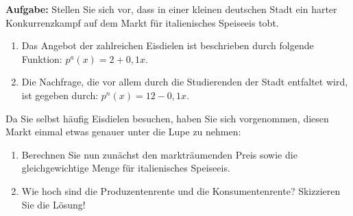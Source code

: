 
\textbf{Aufgabe:}  
Stellen Sie sich vor, dass in einer kleinen deutschen Stadt ein harter Konkurrenzkampf auf dem Markt für italienisches Speiseeis tobt.  

\begin{enumerate}[label=\alph*)]
    \item Das Angebot der zahlreichen Eisdielen ist beschrieben durch folgende Funktion: $p^a(x) = 2 + 0,1x$.
    \item Die Nachfrage, die vor allem durch die Studierenden der Stadt entfaltet wird, ist gegeben durch: $p^n(x) = 12 - 0,1x$.
\end{enumerate}

Da Sie selbst häufig Eisdielen besuchen, haben Sie sich vorgenommen, diesen Markt einmal etwas genauer unter die Lupe zu nehmen:

\begin{enumerate}[label=\alph*)]
    \item Berechnen Sie nun zunächst den markträumenden Preis sowie die gleichgewichtige Menge für italienisches Speiseeis.
    \item Wie hoch sind die Produzentenrente und die Konsumentenrente? Skizzieren Sie die Lösung!
\end{enumerate}


